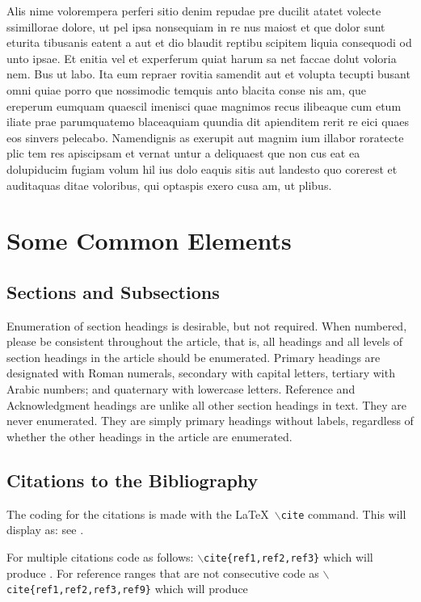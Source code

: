 \documentclass[lettersize,journal]{IEEEtran}
\begin{document}
Alis nime volorempera perferi sitio denim repudae pre ducilit atatet volecte ssimillorae dolore, ut pel ipsa nonsequiam in re nus maiost et que dolor sunt eturita tibusanis eatent a aut et dio blaudit reptibu scipitem liquia consequodi od unto ipsae. Et enitia vel et experferum quiat harum sa net faccae dolut voloria nem. Bus ut labo. Ita eum repraer rovitia samendit aut et volupta tecupti busant omni quiae porro que nossimodic temquis anto blacita conse nis am, que ereperum eumquam quaescil imenisci quae magnimos recus ilibeaque cum etum iliate prae parumquatemo blaceaquiam quundia dit apienditem rerit re eici quaes eos sinvers pelecabo. Namendignis as exerupit aut magnim ium illabor roratecte plic tem res apiscipsam et vernat untur a deliquaest que non cus eat ea dolupiducim fugiam volum hil ius dolo eaquis sitis aut landesto quo corerest et auditaquas ditae voloribus, qui optaspis exero cusa am, ut plibus.


\section{Some Common Elements}
\subsection{Sections and Subsections}
Enumeration of section headings is desirable, but not required. When numbered, please be consistent throughout the article, that is, all headings and all levels of section headings in the article should be enumerated. Primary headings are designated with Roman numerals, secondary with capital letters, tertiary with Arabic numbers; and quaternary with lowercase letters. Reference and Acknowledgment headings are unlike all other section headings in text. They are never enumerated. They are simply primary headings without labels, regardless of whether the other headings in the article are enumerated.

\subsection{Citations to the Bibliography}
The coding for the citations is made with the \LaTeX\ $\backslash${\tt{cite}} command.
This will display as: see \cite{ref1}.

For multiple citations code as follows: {\tt{$\backslash$cite\{ref1,ref2,ref3\}}}
 which will produce \cite{ref1,ref2,ref3}. For reference ranges that are not consecutive code as {\tt{$\backslash$cite\{ref1,ref2,ref3,ref9\}}} which will produce  \cite{ref1,ref2,ref3,ref9}
\end{document}

